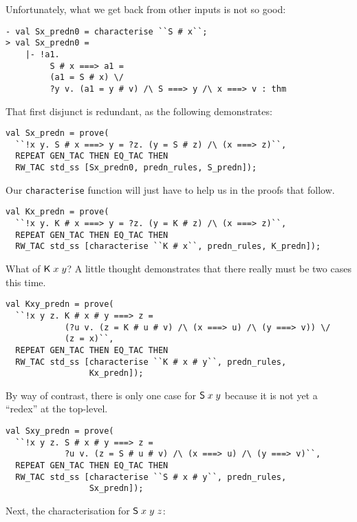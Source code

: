 \documentclass[12pt]{article}
\newcommand{\KC}{\con{K}}
\newcommand{\SC}{\con{S}}
\begin{document}
Unfortunately, what we get back from other inputs is not so good:
\begin{session}\begin{verbatim}
- val Sx_predn0 = characterise ``S # x``;
> val Sx_predn0 =
    |- !a1.
         S # x ===> a1 =
         (a1 = S # x) \/
         ?y v. (a1 = y # v) /\ S ===> y /\ x ===> v : thm
\end{verbatim}\end{session}
That first disjunct is redundant, as the following demonstrates:
\begin{session}\begin{verbatim}
val Sx_predn = prove(
  ``!x y. S # x ===> y = ?z. (y = S # z) /\ (x ===> z)``,
  REPEAT GEN_TAC THEN EQ_TAC THEN
  RW_TAC std_ss [Sx_predn0, predn_rules, S_predn]);
\end{verbatim}\end{session}
Our \texttt{characterise} function will just have to help us in the
proofs that follow.
\begin{session}\begin{verbatim}
val Kx_predn = prove(
  ``!x y. K # x ===> y = ?z. (y = K # z) /\ (x ===> z)``,
  REPEAT GEN_TAC THEN EQ_TAC THEN
  RW_TAC std_ss [characterise ``K # x``, predn_rules, K_predn]);
\end{verbatim}\end{session}
What of $\KC\;x\;y$?  A little thought demonstrates that there really
must be two cases this time.
\begin{session}\begin{verbatim}
val Kxy_predn = prove(
  ``!x y z. K # x # y ===> z =
            (?u v. (z = K # u # v) /\ (x ===> u) /\ (y ===> v)) \/
            (z = x)``,
  REPEAT GEN_TAC THEN EQ_TAC THEN
  RW_TAC std_ss [characterise ``K # x # y``, predn_rules,
                 Kx_predn]);
\end{verbatim}\end{session}
By way of contrast, there is only one case for $\SC\;x\;y$ because it
is not yet a ``redex'' at the top-level.
\begin{session}\begin{verbatim}
val Sxy_predn = prove(
  ``!x y z. S # x # y ===> z =
            ?u v. (z = S # u # v) /\ (x ===> u) /\ (y ===> v)``,
  REPEAT GEN_TAC THEN EQ_TAC THEN
  RW_TAC std_ss [characterise ``S # x # y``, predn_rules,
                 Sx_predn]);
\end{verbatim}\end{session}
Next, the characterisation for $\SC\;x\;y\;z$:
\end{document}
